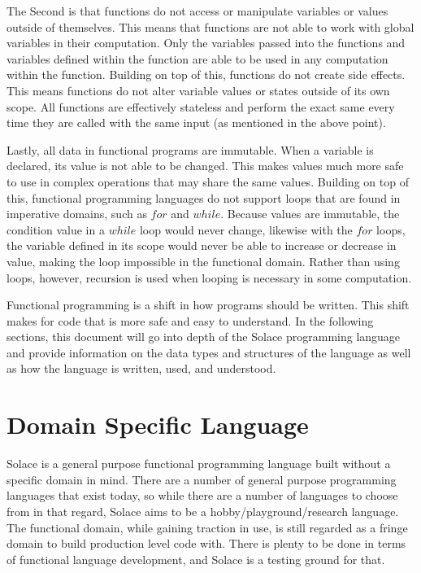 \documentclass{article}
\begin{document}
The Second is that functions do not access or manipulate variables or values outside of themselves. This means
that functions are not able to work with global variables in their computation. Only the variables passed into
the functions and variables defined within the function are able to be used in any computation within the
function. Building on top of this, functions do not create side effects. This means functions do not alter
variable values or states outside of its own scope. All functions are effectively stateless and perform the
exact same every time they are called with the same input (as mentioned in the above point).

Lastly, all data in functional programs are immutable. When a variable is declared, its value is not able to
be changed. This makes values much more safe to use in complex operations that may share the same values. Building
on top of this, functional programming languages do not support loops that are found in imperative domains, such as
$for$ and $while$. Because values are immutable, the condition value in a $while$ loop would never change, likewise with
the $for$ loops, the variable defined in its scope would never be able to increase or decrease in value, making the loop
impossible in the functional domain. Rather than using loops, however, recursion is used when looping is necessary
in some computation.

Functional programming is a shift in how programs should be written. This shift makes for code that is more safe and easy to
understand. In the following sections, this document will go into depth of the Solace programming language and provide
information on the data types and structures of the language as well as how the language is written, used, and understood.


\section{Domain Specific Language}

Solace is a general purpose functional programming language built without a specific domain in mind. There are a number of
general purpose programming languages that exist today, so while there are a number of languages to choose from in that regard,
Solace aims to be a hobby/playground/research language. The functional domain, while gaining traction in use, is still
regarded as a fringe domain to build production level code with. There is plenty to be done in terms of functional language
development, and Solace is a testing ground for that.
\end{document}
